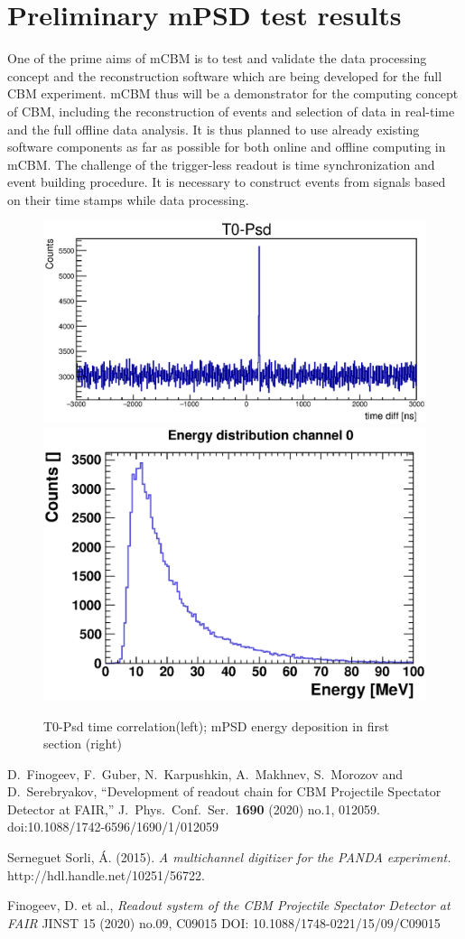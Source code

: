 \documentclass{CBM-PR-2020}
\begin{document}
\section{Preliminary mPSD test results}
One of the prime aims of mCBM is to test and validate the data processing concept and the reconstruction software which are being developed for the full CBM experiment. mCBM thus will be a demonstrator for the computing concept of CBM, including the reconstruction of events and selection of data in real-time and the full offline data analysis. It is thus planned to use already existing software components as far as possible for both online and offline computing in mCBM.
The challenge of the trigger-less readout is time synchronization and event building procedure. It is necessary to construct events from signals based on their time stamps while data processing.

\begin{figure}[htbp]
\centering %
\includegraphics[width=.5\textwidth]{582_time_spectrum.eps}
\quad
\includegraphics[width=.35\textwidth]{en_distrib_ch0.eps}
\caption{\label{fig:6} T0-Psd time correlation(left);  mPSD energy deposition in first section (right)}
\end{figure}




\begin{thebibliography}{9}   %
  D.~Finogeev, F.~Guber, N.~Karpushkin, A.~Makhnev, S.~Morozov and D.~Serebryakov,
  ``Development of readout chain for CBM Projectile Spectator Detector at FAIR,''
  J.\ Phys.\ Conf.\ Ser.\  {\bf 1690} (2020) no.1,  012059.
  doi:10.1088/1742-6596/1690/1/012059
  
Serneguet Sorli, Á. (2015). \emph{A multichannel digitizer for the PANDA experiment.} http://hdl.handle.net/10251/56722.

Finogeev, D. et al., \emph{Readout system of the CBM Projectile Spectator                       Detector at FAIR} JINST 15 (2020) no.09, C09015
DOI: 10.1088/1748-0221/15/09/C09015


\end{thebibliography}
\end{document}
